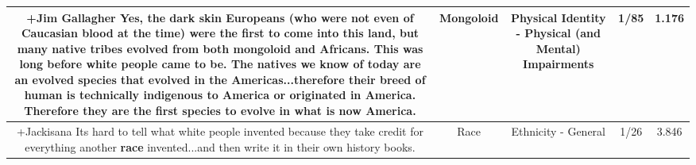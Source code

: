 \documentclass[11pt]{article}
\newlength\mylength
\begin{document}
\begin{center}
\begin{longtable}{|C{.65\mylength}|C{.30\mylength}|C{.12\mylength}|C{.12\mylength}|C{.12\mylength}|}
  \small +Jim Gallagher Yes, the dark skin Europeans (who were not even of Caucasian blood at the time) were the first to come into this land, but many native tribes evolved from both \textbf{mongoloid} and Africans.  This was long before white people came to be.  The natives we know of today are an evolved species that evolved in the Americas...therefore their breed of human is technically indigenous to America or originated in America.  Therefore they are the first species to evolve in what is now America.\normalsize   & Mongoloid & Physical Identity - Physical (and Mental) Impairments & 1/85 & 1.176 \\  \hline
  \small +Jackisana Its hard to tell what white people invented because they take credit for everything another \textbf{race} invented...and then write it in their own history books.\normalsize   & Race & Ethnicity - General & 1/26 & 3.846 \\  \hline

\end{longtable}
\end{center}
\end{document}
